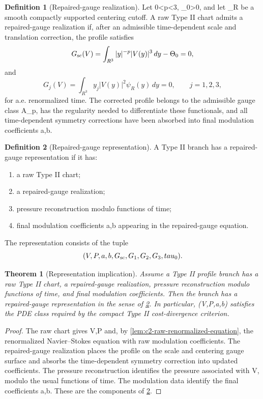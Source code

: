 \documentclass[11pt]{amsart}
\def\({}%
\def\){}%
\def\mathbb#1{#1}%
\def\tau{tau}%
\theoremstyle{plain}
\newtheorem{theorem}{Theorem}[section]
\theoremstyle{definition}
\newtheorem{definition}[definition]{Definition}
\theoremstyle{remark}
\begin{document}
\begin{definition}[Repaired-gauge realization]
\label{def:c2-repaired-gauge-realization}
Let \(0<p<3\), \(\Theta_0>0\), and let \(\psi_R\) be a smooth compactly
supported centering cutoff.  A raw Type II chart admits a repaired-gauge
realization if, after an admissible time-dependent scale and translation
correction, the profile satisfies
\[
  G_{\rm sc}(V)=\int_{\mathbb R^3}|y|^{-p}|V(y)|^3\,dy-\Theta_0=0,
\]
and
\[
  G_j(V)=\int_{\mathbb R^3}y_j|V(y)|^2\psi_R(y)\,dy=0,
  \qquad j=1,2,3,
\]
for a.e. renormalized time.  The corrected profile belongs to the admissible
gauge class \(\mathcal A_p\), has the regularity needed to differentiate these
functionals, and all time-dependent symmetry corrections have been absorbed
into final modulation coefficients \(a,b\).
\end{definition}

\begin{definition}[Repaired-gauge representation]
\label{def:c2-representation}
A Type II branch has a repaired-gauge representation if it has:
\begin{enumerate}[label=\textup{(\roman*)}]
\item a raw Type II chart;
\item a repaired-gauge realization;
\item pressure reconstruction modulo functions of time;
\item final modulation coefficients \(a,b\) appearing in the repaired-gauge
equation.
\end{enumerate}
The representation consists of the tuple
\[
  (V,P,a,b,G_{\rm sc},G_1,G_2,G_3,\tau_0).
\]
\end{definition}

\begin{theorem}[Representation implication]
\label{thm:c2-representation-implication}
Assume a Type II profile branch has a raw Type II chart, a repaired-gauge
realization, pressure reconstruction modulo functions of time, and final
modulation coefficients.  Then the branch has a repaired-gauge representation
in the sense of \cref{def:c2-representation}.  In particular,
\((V,P,a,b)\) satisfies the PDE class required by the compact Type II
cost-divergence criterion.
\end{theorem}

\begin{proof}
The raw chart gives \(V,P\) and, by \cref{lem:c2-raw-renormalized-equation},
the renormalized Navier--Stokes equation with raw modulation coefficients.  The
repaired-gauge realization places the profile on the scale and centering gauge
surface and absorbs the time-dependent symmetry correction into updated
coefficients.  The pressure reconstruction identifies the pressure associated
with \(V\), modulo the usual functions of time.  The modulation data identify
the final coefficients \(a,b\).  These are the components of
\cref{def:c2-representation}.
\end{proof}
\end{document}
